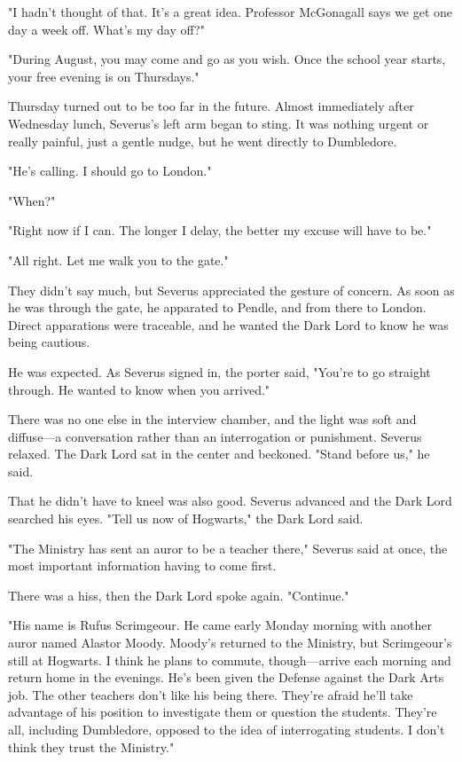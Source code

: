 "I hadn't thought of that. It's a great idea. Professor McGonagall says we get one day a week off. What's my day off?"

"During August, you may come and go as you wish. Once the school year starts, your free evening is on Thursdays."

Thursday turned out to be too far in the future. Almost immediately after Wednesday lunch, Severus's left arm began to sting. It was nothing urgent or really painful, just a gentle nudge, but he went directly to Dumbledore.

"He's calling. I should go to London."

"When?"

"Right now if I can. The longer I delay, the better my excuse will have to be."

"All right. Let me walk you to the gate."

They didn't say much, but Severus appreciated the gesture of concern. As soon as he was through the gate, he apparated to Pendle, and from there to London. Direct apparations were traceable, and he wanted the Dark Lord to know he was being cautious.

He was expected. As Severus signed in, the porter said, "You're to go straight through. He wanted to know when you arrived."

There was no one else in the interview chamber, and the light was soft and diffuse—a conversation rather than an interrogation or punishment. Severus relaxed. The Dark Lord sat in the center and beckoned. "Stand before us," he said.

That he didn't have to kneel was also good. Severus advanced and the Dark Lord searched his eyes. "Tell us now of Hogwarts," the Dark Lord said.

"The Ministry has sent an auror to be a teacher there," Severus said at once, the most important information having to come first.

There was a hiss, then the Dark Lord spoke again. "Continue."

"His name is Rufus Scrimgeour. He came early Monday morning with another auror named Alastor Moody. Moody's returned to the Ministry, but Scrimgeour's still at Hogwarts. I think he plans to commute, though—arrive each morning and return home in the evenings. He's been given the Defense against the Dark Arts job. The other teachers don't like his being there. They're afraid he'll take advantage of his position to investigate them or question the students. They're all, including Dumbledore, opposed to the idea of interrogating students. I don't think they trust the Ministry."

